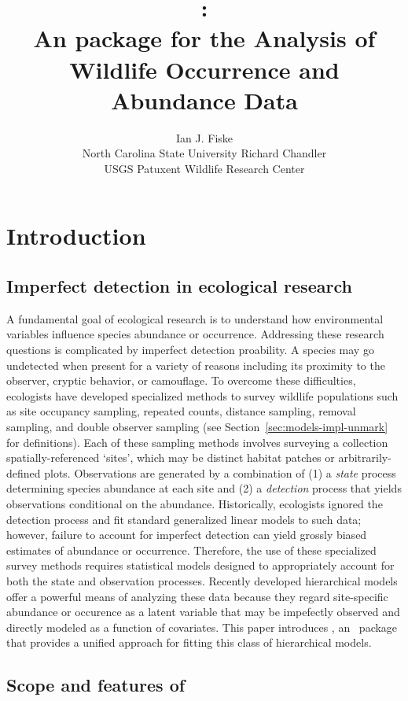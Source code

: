 \documentclass[article,shortnames]{jss}
\author{Ian J. Fiske\\North Carolina State University \And
  Richard Chandler\\ USGS Patuxent Wildlife Research Center}
\title{\pkg{unmarked}:\\
  An \proglang{R} package for the Analysis of Wildlife Occurrence and Abundance Data}
\newcommand{\um}{\pkg{unmarked}}
\newcommand{\rlang}{\proglang{R}}
\begin{document}
\section{Introduction}


\subsection{Imperfect detection in ecological research}

A fundamental goal of ecological research is to understand how environmental 
variables influence species abundance or occurrence.  Addressing these 
research questions is complicated by imperfect detection proability.  A 
species may go undetected when present for a variety of reasons including its 
proximity to the observer, cryptic behavior, or camouflage.  To overcome these 
difficulties, ecologists have developed specialized methods to survey 
wildlife populations such as site occupancy sampling, repeated counts, 
distance sampling, removal sampling, and double observer sampling 
(see Section~\ref{sec:models-impl-unmark} for definitions).  Each of these 
sampling methods involves surveying a collection spatially-referenced `sites', 
which may be distinct habitat patches or arbitrarily-defined plots.  
Observations are generated by a combination of (1) a \emph{state} process 
determining species abundance at each site and (2) a \emph{detection} process 
that yields observations conditional on the abundance.  Historically, 
ecologists ignored the detection process and fit standard generalized linear 
models to such data; however, failure to account for imperfect detection can 
yield grossly biased estimates of abundance or occurrence.  Therefore, the use 
of these specialized survey methods requires statistical models designed to 
appropriately account for both the state and observation processes. Recently 
developed hierarchical models offer a powerful means of analyzing these data 
because they regard site-specific abundance or occurence as a latent variable 
that may be impefectly observed and directly modeled as a function of 
covariates.  This paper introduces \um, an \rlang\ package that provides a 
unified approach for fitting this class of hierarchical models.

\subsection[Scope and features of unmarked]{Scope and features of } 
\end{document}
